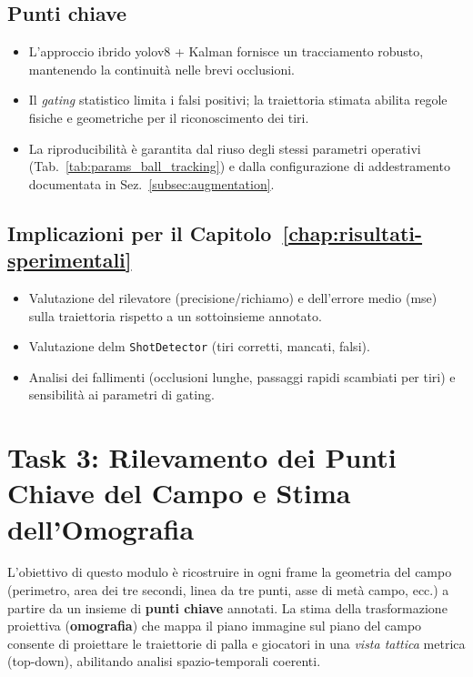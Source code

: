 \documentclass[12pt,a4paper,openright,twoside]{book}
\begin{document}
\subsection*{Punti chiave}
\begin{itemize}
  \item L'approccio ibrido \ac{yolo}v8 + Kalman fornisce un tracciamento 
  robusto, mantenendo la continuità nelle brevi occlusioni.
  \item Il \emph{gating} statistico limita i falsi positivi; la traiettoria 
  stimata abilita regole fisiche e geometriche per il riconoscimento dei tiri.
  \item La riproducibilità è garantita dal riuso degli stessi parametri 
  operativi (Tab.~\ref{tab:params_ball_tracking}) e dalla configurazione 
  di addestramento documentata in Sez.~\ref{subsec:augmentation}.
\end{itemize}

\subsection*{Implicazioni per il Capitolo~\ref{chap:risultati-sperimentali}}
\begin{itemize}
  \item Valutazione del rilevatore (precisione/richiamo) e dell'errore 
  medio (\ac{mse}) sulla traiettoria rispetto a un sottoinsieme annotato.
  \item Valutazione delm \texttt{ShotDetector} (tiri corretti, mancati, falsi).
  \item Analisi dei fallimenti (occlusioni lunghe, passaggi rapidi scambiati 
  per tiri) e sensibilità ai parametri di gating.
\end{itemize}


\section{Task 3: Rilevamento dei Punti Chiave del Campo e Stima dell'Omografia}
\label{sec:task-3}

L'obiettivo di questo modulo è ricostruire in ogni frame la geometria del campo
(perimetro, area dei tre secondi, linea da tre punti, asse di metà campo, ecc.)
a partire da un insieme di \textbf{punti chiave} annotati.
La stima della trasformazione proiettiva (\textbf{omografia}) che mappa il piano
immagine sul piano del campo consente di proiettare le traiettorie di palla e
giocatori in una \emph{vista tattica} metrica (top-down), abilitando analisi
spazio-temporali coerenti.
\end{document}
